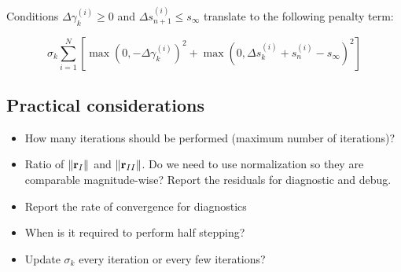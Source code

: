 \documentclass{article}
\begin{document}
Conditions $\Delta \gamma_k^{(i)} \ge 0$ and $\Delta s_{n+1}^{(i)} \le s_{\infty}$ translate to the following penalty term:

\begin{equation}
    \sigma_k \sum_{i=1}^N
    \left[
        \max \left( 0, - \Delta \gamma_k^{(i)}\right) ^ 2 +
        \max \left( 0, \Delta s_k^{(i)} + s_n^{(i)} - s_{\infty}\right) ^ 2
    \right]
\end{equation}

\subsection{Practical considerations}
\begin{itemize}
    \item How many iterations should be performed (maximum number of iterations)?
    \item Ratio of $\|{\bf r}_I\|$ and $\|{\bf r}_{II}\|$. Do we need to use normalization so they are comparable magnitude-wise? Report the residuals for diagnostic and debug.
    \item Report the rate of convergence for diagnostics
    \item When is it required to perform half stepping?
    \item Update $\sigma_k$ every iteration or every few iterations?
\end{itemize}
\end{document}
